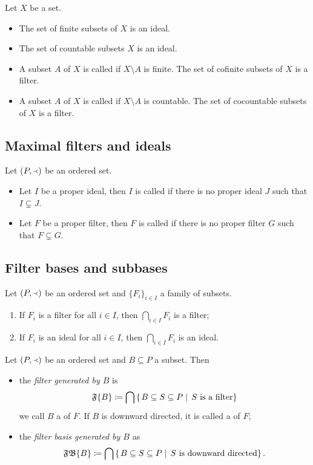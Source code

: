 \begin{example}
Let $X$ be a set.
\begin{itemize}
\item The set of finite subsets of $X$ is an ideal.
\item The set of countable subsets $X$ is an ideal.
\item A subset $A$ of $X$ is called  if $X\setminus A$ is finite. The set of cofinite subsets of $X$ is a filter.
\item A subset $A$ of $X$ is called  if $X\setminus A$ is countable. The set of cocountable subsets of $X$ is a filter.
\end{itemize}
\end{example}

\subsection{Maximal filters and ideals}
\begin{definition}
Let $\left( P,\Yleft \right)$ be an ordered set.
\begin{itemize}
\item Let $I$ be a proper ideal, then $I$ is called  if there is no proper ideal $J$ such that $I \subsetneq J$.
\item Let $F$ be a proper filter, then $F$ is called  if there is no proper filter $G$ such that $F \subsetneq G$.
\end{itemize}
\end{definition}

\subsection{Filter bases and subbases}

\begin{lemma}
Let $\left( P,\Yleft \right)$ be an ordered set and $\{F_i\}_{i\in I}$ a family of subsets.
\begin{enumerate}
\item If $F_i$ is a filter for all $i\in I$, then $\bigcap_{i\in I}F_i$ is a filter;
\item If $F_i$ is an ideal for all $i\in I$, then $\bigcap_{i\in I}F_i$ is an ideal.
\end{enumerate}
\end{lemma}

\begin{definition}
Let $\left( P,\Yleft \right)$ be an ordered set and $B\subseteq P$ a subset. Then
\begin{itemize}
\item the \emph{filter generated by $B$} is
\[ \mathfrak{F}\{B\} \coloneqq \bigcap\left\{\left. B \subseteq S\subseteq P \;\right|\; \text{$S$ is a filter} \right\} \]
we call $B$ a  of $F$. If $B$ is downward directed, it is called a  of $F$;
\item the \emph{filter basis generated by $B$} as
\[ \mathfrak{FB}\{B\} \coloneqq \bigcap\left\{\left. B \subseteq S\subseteq P \;\right|\; \text{$S$ is downward directed} \right\}. \]
\end{itemize}
\end{definition}

